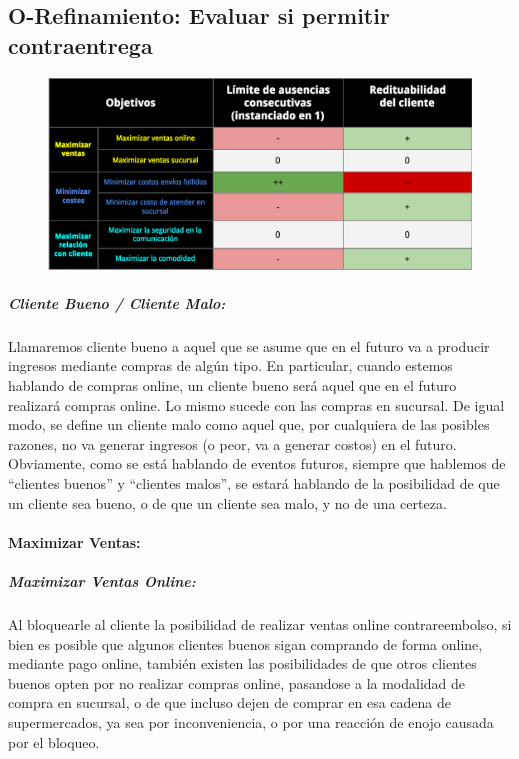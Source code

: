 \newpage
\subsection{O-Refinamiento: Evaluar si permitir contraentrega}
\begin{figure}[H]
  \includegraphics[width=\linewidth]{tp1/images/objetivo-blando-ranking-cliente.png}
\end{figure}

\subparagraph{Cliente Bueno / Cliente Malo:}

Llamaremos cliente bueno a aquel que se asume que en el futuro va a producir
ingresos mediante compras de algún tipo. En particular, cuando estemos
hablando de compras online, un cliente bueno será aquel que en el futuro
realizará compras online. Lo mismo sucede con las compras en sucursal. De
igual modo, se define un cliente malo como aquel que, por cualquiera de las
posibles razones, no va generar ingresos (o peor, va a generar costos) en el
futuro. Obviamente, como se está hablando de eventos futuros, siempre que
hablemos de ``clientes buenos'' y ``clientes malos'', se estará hablando de la
posibilidad de que un cliente sea bueno, o de que un cliente sea malo, y no de
una certeza.

\paragraph{Maximizar Ventas:}

\subparagraph{Maximizar Ventas Online:}

Al bloquearle al cliente la posibilidad de realizar ventas online
contrareembolso, si bien es posible que algunos clientes buenos sigan
comprando de forma online, mediante pago online, también existen las
posibilidades de que otros clientes buenos opten por no realizar compras
online, pasandose a la modalidad de compra en sucursal, o de que incluso dejen
de comprar en esa cadena de supermercados, ya sea por inconveniencia, o por
una reacción de enojo causada por el bloqueo.

